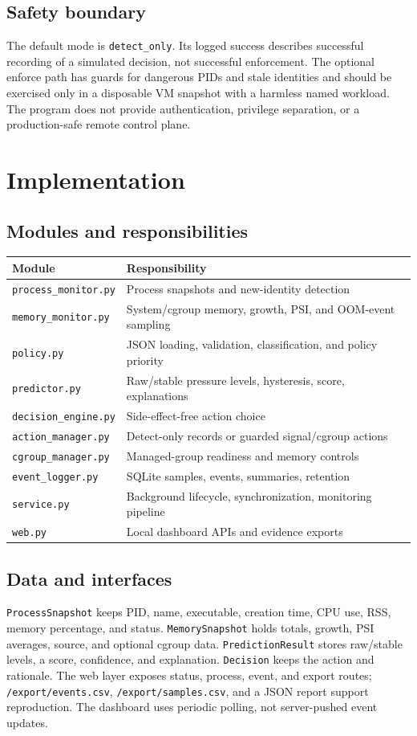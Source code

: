 \documentclass[12pt,a4paper]{article}
\newcommand{\code}[1]{\texttt{#1}}
\begin{document}
\subsection{Safety boundary}
The default mode is \code{detect\_only}. Its logged success describes successful recording of a simulated decision, not successful enforcement. The optional enforce path has guards for dangerous PIDs and stale identities and should be exercised only in a disposable VM snapshot with a harmless named workload. The program does not provide authentication, privilege separation, or a production-safe remote control plane.

\section{Implementation}
\subsection{Modules and responsibilities}
\begin{tabularx}{\textwidth}{p{}X}
\toprule Module & Responsibility\\\midrule
\code{process\_monitor.py} & Process snapshots and new-identity detection\\
\code{memory\_monitor.py} & System/cgroup memory, growth, PSI, and OOM-event sampling\\
\code{policy.py} & JSON loading, validation, classification, and policy priority\\
\code{predictor.py} & Raw/stable pressure levels, hysteresis, score, explanations\\
\code{decision\_engine.py} & Side-effect-free action choice\\
\code{action\_manager.py} & Detect-only records or guarded signal/cgroup actions\\
\code{cgroup\_manager.py} & Managed-group readiness and memory controls\\
\code{event\_logger.py} & SQLite samples, events, summaries, retention\\
\code{service.py} & Background lifecycle, synchronization, monitoring pipeline\\
\code{web.py} & Local dashboard APIs and evidence exports\\
\bottomrule
\end{tabularx}

\subsection{Data and interfaces}
\code{ProcessSnapshot} keeps PID, name, executable, creation time, CPU use, RSS, memory percentage, and status. \code{MemorySnapshot} holds totals, growth, PSI averages, source, and optional cgroup data. \code{PredictionResult} stores raw/stable levels, a score, confidence, and explanation. \code{Decision} keeps the action and rationale. The web layer exposes status, process, event, and export routes; \code{/export/events.csv}, \code{/export/samples.csv}, and a JSON report support reproduction. The dashboard uses periodic polling, not server-pushed event updates.
\end{document}
